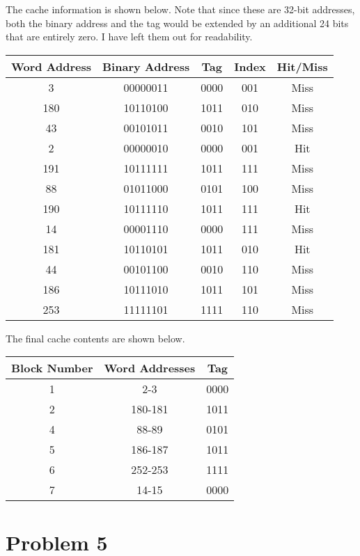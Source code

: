 \documentclass[12pt]{article}
\begin{document}
The cache information is shown below. Note that since these are 32-bit addresses, both the binary address and the tag would be
extended by an additional 24 bits that are entirely zero. I have left them out for readability.
\begin{center}
        \begin{tabular}{c|c|c|c|c}
                Word Address & Binary Address & Tag & Index & Hit/Miss\\
                \hline
                3 & 00000011 & 0000 & 001 & Miss\\
                180 & 10110100 & 1011 & 010 & Miss\\
                43 & 00101011 & 0010 & 101 & Miss\\
                2 & 00000010 & 0000 & 001 & Hit\\
                191 & 10111111 & 1011 & 111 & Miss\\
                88 & 01011000 & 0101 & 100 & Miss\\
                190 & 10111110 & 1011 & 111 & Hit\\
                14 & 00001110 & 0000 & 111 & Miss\\
                181 & 10110101 & 1011 & 010 & Hit\\
                44 & 00101100 & 0010 & 110 & Miss\\
                186 & 10111010 & 1011 & 101 & Miss\\
                253 & 11111101 & 1111 & 110 & Miss
        \end{tabular}
\end{center}
The final cache contents are shown below.
\begin{center}
        \begin{tabular}{c|c|c}
                Block Number & Word Addresses & Tag \\
                \hline
                1 & 2-3 & 0000 \\
                2 & 180-181 & 1011 \\
                4 & 88-89 & 0101 \\
                5 & 186-187 & 1011 \\
                6 & 252-253 & 1111 \\
                7 & 14-15 & 0000
        \end{tabular}
\end{center}

\section*{Problem 5}
\end{document}
